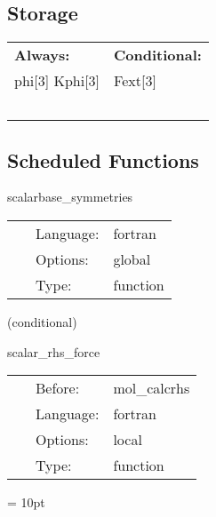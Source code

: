 \subsection*{Storage}

\hspace{5mm}

 \begin{tabular*}{160mm}{ll} 

{\bf Always:}& {\bf Conditional:} \\ 
 phi[3] Kphi[3] &  Fext[3]\\ 
~ & ~\\ 
\end{tabular*} 


\subsection*{Scheduled Functions}
\vspace{5mm}


\hspace{5mm} scalarbase\_symmetries 

\hspace{5mm}{\it register symmetries of the grid functions } 


\hspace{5mm}

 \begin{tabular*}{160mm}{cll} 
~ & Language:  & fortran \\ 
~ & Options:  & global \\ 
~ & Type:  & function \\ 
\end{tabular*} 


\vspace{5mm}

   (conditional) 

\hspace{5mm} scalar\_rhs\_force 

\hspace{5mm}{\it writes external force grid function } 


\hspace{5mm}

 \begin{tabular*}{160mm}{cll} 
~ & Before:  & mol\_calcrhs \\ 
~ & Language:  & fortran \\ 
~ & Options:  & local \\ 
~ & Type:  & function \\ 
\end{tabular*} 



\vspace{5mm}\parskip = 10pt 

